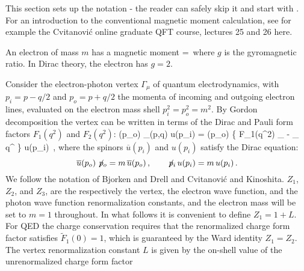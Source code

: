 \noindent
This section sets up the notation - the reader can safely skip it and
start with . For an introduction to the
conventional magnetic moment calculation, see for example the
Cvitanovi\'c online graduate QFT course, lectures 25 and 26
{here}.

An electron of mass $m$  has a magnetic moment
\beq
\mu=\,
where $g$ is the gyromagnetic ratio.
In Dirac theory, the electron has $g=2$.

Consider the electron-photon vertex $\Gamma_{\mu}$ of quantum
electrodynamics, with $p_{i}=p-q/2$ and $p_{o}=p+q/2$ the momenta of
incoming and outgoing electron lines, evaluated on the electron mass
shell $p_{i}^2=p_{o}^2=m^2$.
By Gordon decomposition the vertex can be written in terms of the Dirac
and Pauli form factors $F_1(q^2)$ and $F_2(q^2)$:
\beq
{}(p_{o}) \Gamma_{\mu}(p,q) %
u(p_{i})
    =    %
(p_{o}) \Bigg\{ F_1(q^2) \gamma_{\mu} -
 \; \sigma_{\mu \nu} q^{\nu} \Bigg\} u(p_{i}) \,,
\label{BAGTB17(35-1)}
\eeq
where the spinors  $\overline{u}(p_{i})$ and $u(p_{i})$  satisfy the Dirac
equation:
\[
\overline{u}(p_{o}) \not\!{p}_{o} = m \, \overline{u}(p_{o})
\,, \qquad
\not\!{p}_{i} \, u(p_{i})  =  m \, u(p_{i}) \,.
\]
We follow the notation of Bjorken and Drell
and Cvitanovi{\'c} and Kinoshita.
$Z_1$,
$Z_2$, and %
$Z_3$,
are the respectively the vertex,
the electron wave function, and
the photon wave function
renormalization constants,
and the electron mass will be set to $m = 1$ throughout.
In what follows it is convenient to define $Z_1=1+L$.
For QED the charge conservation requires that the renormalized charge
form factor satisfies $\tilde{F}_1(0) = 1$, which is guaranteed by the
Ward identity
$Z_1=Z_2$.
The vertex renormalization constant $L$ is given by the
on-shell value of the unrenormalized charge form factor
